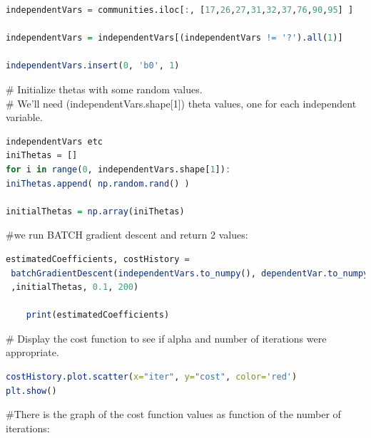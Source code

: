 \documentclass[10pt,a4paper]{article}
\begin{document}
\begin{lstlisting}[language=R]	
independentVars = communities.iloc[:, [17,26,27,31,32,37,76,90,95] ]
	
independentVars = independentVars[(independentVars != '?').all(1)]
	
independentVars.insert(0, 'b0', 1)
\end{lstlisting}
\# Initialize thetas with some random values.\\
\# We'll need (independentVars.shape[1])  theta values, one for each independent variable.\\
\begin{lstlisting}[language=R]		
independentVars etc
iniThetas = []
for i in range(0, independentVars.shape[1]):
iniThetas.append( np.random.rand() )
	
initialThetas = np.array(iniThetas)
\end{lstlisting}	
	
\#we run BATCH gradient descent and return 2 values: \\
\begin{lstlisting}[language=R]	
estimatedCoefficients, costHistory =
 batchGradientDescent(independentVars.to_numpy(), dependentVar.to_numpy()
 ,initialThetas, 0.1, 200)
	
	print(estimatedCoefficients)
\end{lstlisting}		
\# Display the cost function to see if alpha and number of iterations were appropriate.
\begin{lstlisting}[language=R]	
costHistory.plot.scatter(x="iter", y="cost", color='red')
plt.show()
\end{lstlisting}	
\#There is the graph of the cost function values ​​as
function of the number of iterations:
\\
\vspace{2cm}
{}
\\[0.5cm]
\bigskip  \bigskip
\end{document}
